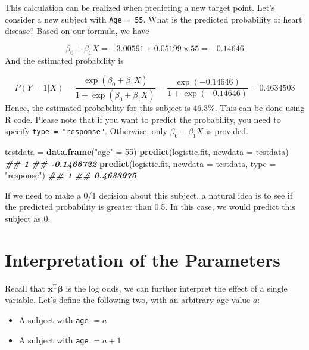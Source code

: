 \documentclass[
]{book}
\newenvironment{Shaded}{\begin{snugshade}}{\end{snugshade}}
\newcommand{\AttributeTok}[1]{\textcolor[rgb]{0.13,0.29,0.53}{#1}}
\newcommand{\DecValTok}[1]{\textcolor[rgb]{0.00,0.00,0.81}{#1}}
\newcommand{\DocumentationTok}[1]{\textcolor[rgb]{0.56,0.35,0.01}{\textbf{\textit{#1}}}}
\newcommand{\FunctionTok}[1]{\textcolor[rgb]{0.13,0.29,0.53}{\textbf{#1}}}
\newcommand{\NormalTok}[1]{#1}
\newcommand{\OtherTok}[1]{\textcolor[rgb]{0.56,0.35,0.01}{#1}}
\newcommand{\StringTok}[1]{\textcolor[rgb]{0.31,0.60,0.02}{#1}}
\providecommand{\tightlist}{%
  \setlength{\itemsep}{0pt}\setlength{\parskip}{0pt}}
\theoremstyle{definition}
\theoremstyle{definition}
\theoremstyle{definition}
\theoremstyle{definition}
\theoremstyle{remark}
\begin{document}
This calculation can be realized when predicting a new target point. Let's consider a new subject with \texttt{Age\ =\ 55}. What is the predicted probability of heart disease? Based on our formula, we have

\[\beta_0 + \beta_1 X = -3.00591 + 0.05199 \times 55 = -0.14646\]
And the estimated probability is

\[ P(Y = 1 | X) = \frac{\exp(\beta_0 + \beta_1 X)}{1 + \exp(\beta_0 + \beta_1 X)} = \frac{\exp(-0.14646)}{1 + \exp(-0.14646)} = 0.4634503\]
Hence, the estimated probability for this subject is 46.3\%. This can be done using R code. Please note that if you want to predict the probability, you need to specify \texttt{type\ =\ "response"}. Otherwise, only \(\beta_0 + \beta_1 X\) is provided.

\begin{Shaded}
\begin{Highlighting}[]
\NormalTok{  testdata }\OtherTok{=} \FunctionTok{data.frame}\NormalTok{(}\StringTok{"age"} \OtherTok{=} \DecValTok{55}\NormalTok{)}
  \FunctionTok{predict}\NormalTok{(logistic.fit, }\AttributeTok{newdata =}\NormalTok{ testdata)}
\DocumentationTok{\#\#          1 }
\DocumentationTok{\#\# {-}0.1466722}
  \FunctionTok{predict}\NormalTok{(logistic.fit, }\AttributeTok{newdata =}\NormalTok{ testdata, }\AttributeTok{type =} \StringTok{"response"}\NormalTok{)}
\DocumentationTok{\#\#         1 }
\DocumentationTok{\#\# 0.4633975}
\end{Highlighting}
\end{Shaded}

If we need to make a 0/1 decision about this subject, a natural idea is to see if the predicted probability is greater than 0.5. In this case, we would predict this subject as 0.

\hypertarget{interpretation-of-the-parameters}{%
\section{Interpretation of the Parameters}\label{interpretation-of-the-parameters}}

Recall that \(\mathbf{x}^\text{T}\boldsymbol \beta\) is the log odds, we can further interpret the effect of a single variable. Let's define the following two, with an arbitrary age value \(a\):

\begin{itemize}
\tightlist
\item
  A subject with \texttt{age} \(= a\)
\item
  A subject with \texttt{age} \(= a + 1\)
\end{itemize}
\end{document}
